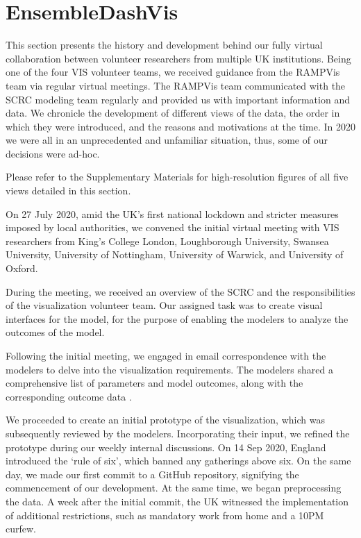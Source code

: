 \section{EnsembleDashVis}
\label{sec:EnsembleDashVis}

This section presents the history and development behind our fully virtual collaboration between volunteer researchers from multiple UK institutions.
Being one of the four VIS volunteer teams, we received guidance from the RAMPVis team via regular virtual meetings. The RAMPVis team communicated with the SCRC modeling team regularly and provided us with important information and data.
We chronicle the development of different views of the data, the order in which they were introduced, and the reasons and motivations at the time.
In 2020 we were all in an unprecedented and unfamiliar situation, thus, some of our decisions were ad-hoc.

Please refer to the Supplementary Materials for high-resolution figures of all five views detailed in this section.


\label{subsec:InitialMeeting}
On 27 July 2020, amid the UK's first national lockdown and stricter measures imposed by local authorities, we convened the initial virtual meeting with VIS researchers from King's College London, Loughborough University, Swansea University, University of Nottingham, University of Warwick, and University of Oxford.

During the meeting, we received an overview of the SCRC and the responsibilities of the visualization volunteer team.
Our assigned task was to create visual interfaces for the model, for the purpose of enabling the modelers to analyze the outcomes of the model.

Following the initial meeting, we engaged in email correspondence with the modelers to delve into the visualization requirements. The modelers shared a comprehensive list of parameters and model outcomes, along with the corresponding outcome data \cite{scrc2020Covid19}.


We proceeded to create an initial prototype of the visualization, which was subsequently reviewed by the modelers.
Incorporating their input, we refined the prototype during our weekly internal discussions.
On 14 Sep 2020, England introduced the `rule of six', which banned any gatherings above six.
On the same day, we made our first commit to a GitHub repository, signifying the commencement of our development.
At the same time, we began preprocessing the data.
A week after the initial commit, the UK witnessed the implementation of additional restrictions, such as mandatory work from home and a 10PM curfew.

